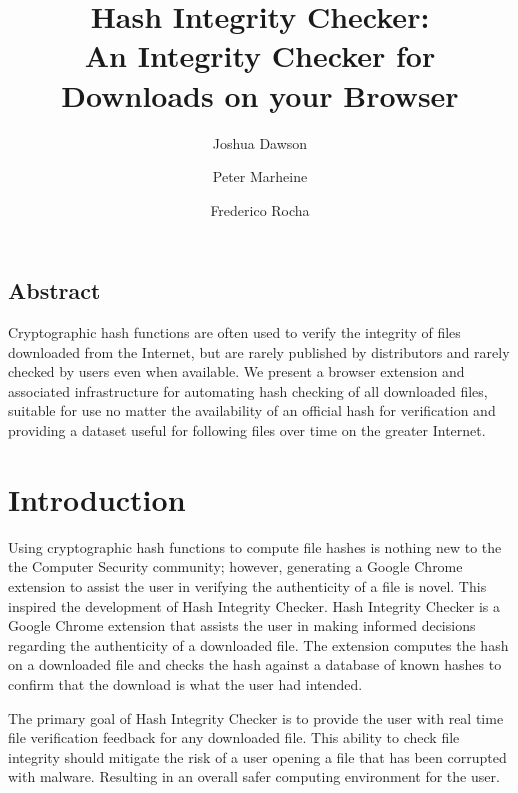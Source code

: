 \documentclass[letterpaper,twocolumn,10pt]{article}
\begin{document}
\date{}

\title{\Large \bf Hash Integrity Checker:\protect\\An Integrity Checker for Downloads on your Browser}

\author{
{\rm Joshua Dawson}
\and
{\rm Peter Marheine}
\and
{\rm Frederico Rocha}
}

\maketitle


\subsection*{Abstract}

Cryptographic hash functions are often used to verify the integrity of files downloaded from the Internet, but are rarely published by distributors and rarely checked by users even when available. We present a browser extension and associated infrastructure for automating hash checking of all downloaded files, suitable for use no matter the availability of an official hash for verification and providing a dataset useful for following files over time on the greater Internet.

\section{Introduction}

Using cryptographic hash functions to compute file hashes is nothing new to the the Computer Security community; however, generating a Google Chrome extension to assist the user in verifying the authenticity of a file is novel. This inspired the development of Hash Integrity Checker. Hash Integrity Checker is a Google Chrome extension that assists the user in making informed decisions regarding the authenticity of a downloaded file. The extension computes the hash on a downloaded file and checks the hash against a database of known hashes to confirm that the download is what the user had intended.

The primary goal of Hash Integrity Checker is to provide the user with real time file verification feedback for any downloaded file. This ability to check file integrity should mitigate the risk of a user opening a file that has been corrupted with malware. Resulting in an overall safer computing environment for the user.
\end{document}
